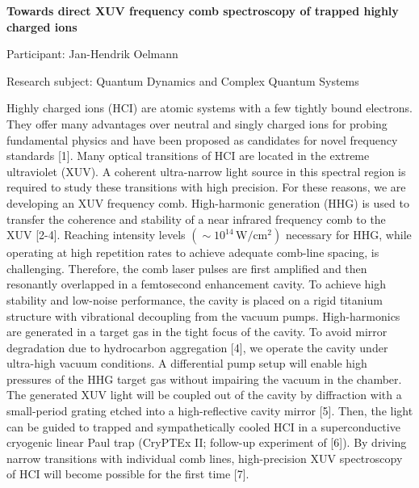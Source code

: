 \begin{minipage}[t]{1.0\textwidth}

\begin{center}

{{\large\bfseries Towards direct XUV frequency comb spectroscopy of trapped highly charged ions}\par}

\end{center}

{\noindent Participant: Jan-Hendrik Oelmann\par} 

{\noindent Research subject: Quantum Dynamics and Complex Quantum Systems\par}\medskip

\noindent Highly charged ions (HCI) are atomic systems with a few tightly bound electrons. They offer many advantages over neutral and singly charged ions for probing fundamental physics and have been proposed as candidates for novel frequency standards [1].	
Many optical transitions of HCI are located in the extreme ultraviolet (XUV). A coherent ultra-narrow light source in this spectral region is required to study these transitions with high precision.
For these reasons, we are developing an XUV frequency comb. High-harmonic generation (HHG) is used to transfer the coherence and stability of a near infrared frequency comb to the XUV [2-4]. 
Reaching intensity levels $(\sim10^{14}\,\text{W}/\text{cm}^2)$ necessary for HHG, while operating at high repetition rates to achieve adequate comb-line spacing, is challenging. 
Therefore, the comb laser pulses are first amplified and then resonantly overlapped in a femtosecond enhancement cavity. To achieve high stability and low-noise performance, the cavity is placed on a rigid titanium structure with vibrational decoupling from the vacuum pumps. High-harmonics are generated in a target gas in the tight focus of the cavity. To avoid mirror degradation due to hydrocarbon aggregation [4], we operate the cavity under ultra-high vacuum conditions. A differential pump setup will enable high pressures of the HHG target gas without impairing the vacuum in the chamber.
The generated XUV light will be coupled out of the cavity by diffraction with a small-period grating etched into a high-reflective cavity mirror [5]. Then, the light can be guided to trapped and sympathetically cooled HCI in a superconductive cryogenic linear Paul trap (CryPTEx II; follow-up experiment of [6]). By driving narrow transitions with individual comb lines, high-precision XUV spectroscopy of HCI will become possible for the first time [7].


\end{minipage}
